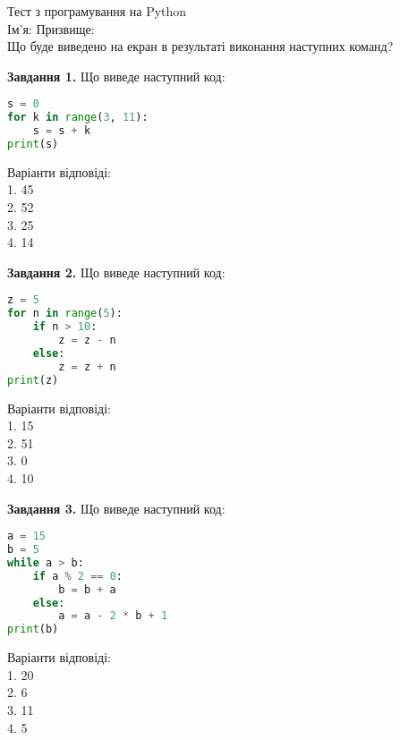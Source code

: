 \documentclass{article}
\begin{document}
\begin{center}
    \LARGE Тест з програмування на Python \\
    \vspace{1em}
    Ім'я: \underline{\hspace{5cm}} Призвище: \underline{\hspace{5cm}} \\
    \vspace{1em}
    Що буде виведено на екран в результаті виконання наступних команд?
\end{center}

\begin{multicols}{2}
\begin{tcolorbox}
\textbf{Завдання 1.} Що виведе наступний код:
\begin{lstlisting}[language=Python]
s = 0
for k in range(3, 11):
    s = s + k
print(s)
\end{lstlisting}
Варіанти відповіді: \\
1. 45 \\
2. 52 \\
3. 25 \\
4. 14 \\
\end{tcolorbox}

\begin{tcolorbox}
\textbf{Завдання 2.} Що виведе наступний код:
\begin{lstlisting}[language=Python]
z = 5
for n in range(5):
    if n > 10:
        z = z - n
    else:
        z = z + n
print(z)
\end{lstlisting}
Варіанти відповіді: \\
1. 15 \\
2. 51 \\
3. 0 \\
4. 10 \\
\end{tcolorbox}

\begin{tcolorbox}
\textbf{Завдання 3.} Що виведе наступний код:
\begin{lstlisting}[language=Python]
a = 15
b = 5
while a > b:
    if a % 2 == 0:
        b = b + a
    else:
        a = a - 2 * b + 1
print(b)
\end{lstlisting}
Варіанти відповіді: \\
1. 20 \\
2. 6 \\
3. 11 \\
4. 5 \\
\end{tcolorbox}


\end{multicols}
\end{document}

